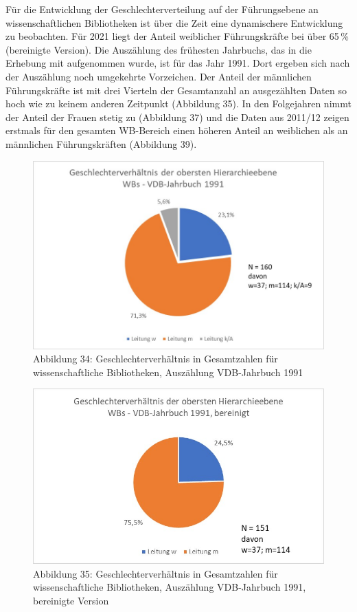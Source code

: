 \documentclass[a4paper,
fontsize=11pt,
oneside,
numbers=noperiodatend,
parskip=half-,
bibliography=totoc,
final
]{scrartcl}
\begin{document}
Für die Entwicklung der Geschlechterverteilung auf der Führungsebene an
wissenschaftlichen Bibliotheken ist über die Zeit eine dynamischere
Entwicklung zu beobachten. Für 2021 liegt der Anteil weiblicher
Führungskräfte bei über 65\,\% (bereinigte Version). Die Auszählung des
frühesten Jahrbuchs, das in die Erhebung mit aufgenommen wurde, ist für
das Jahr 1991. Dort ergeben sich nach der Auszählung noch umgekehrte
Vorzeichen. Der Anteil der männlichen Führungskräfte ist mit drei
Vierteln der Gesamtanzahl an ausgezählten Daten so hoch wie zu keinem
anderen Zeitpunkt (Abbildung 35). In den Folgejahren nimmt der Anteil
der Frauen stetig zu (Abbildung 37) und die Daten aus 2011/12 zeigen
erstmals für den gesamten WB-Bereich einen höheren Anteil an weiblichen
als an männlichen Führungskräften (Abbildung 39).

\begin{figure}
\centering
\includegraphics{img/Abb_34_VDB-1991_gesamt.jpg}
\caption{Abbildung 34: Geschlechterverhältnis in Gesamtzahlen für
wissenschaftliche Bibliotheken, Auszählung VDB-Jahrbuch 1991}
\end{figure}

\begin{figure}
\centering
\includegraphics{img/Abb_35_VDB-1991_gesamt_bereinigt.jpg}
\caption{Abbildung 35: Geschlechterverhältnis in Gesamtzahlen für
wissenschaftliche Bibliotheken, Auszählung VDB-Jahrbuch 1991, bereinigte
Version}
\end{figure}
\end{document}
